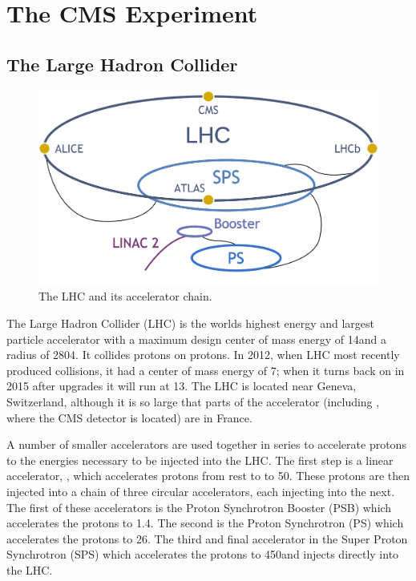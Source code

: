 
\chapter{The CMS Experiment}
\label{experiment_chapter}

\section{The Large Hadron Collider}
\label{lhc_section}

\begin{figure}[tb]
    \centering
    \includegraphics[width=\textwidth]{figures/alex_lhc_layout.pdf}
    \caption{The LHC and its accelerator chain.}
    \label{fig:lhc_layout}
\end{figure}

The Large Hadron Collider (LHC) is the worlds highest energy and largest
particle accelerator with a maximum design center of mass energy of 14\TeV and
a radius of 2804\meters \cite{bruning2004}. It collides protons on protons. In
2012, when LHC most recently produced collisions, it had a center of mass
energy of 7\TeV; when it turns back on in 2015 after upgrades it will run at
13\TeV. The LHC is located near Geneva, Switzerland, although it is so large
that parts of the accelerator (including \pointfive, where the CMS detector is
located) are in France.

A number of smaller accelerators are used together in series to accelerate
protons to the energies necessary to be injected into the LHC. The first step
is a linear accelerator, \linactwo, which accelerates protons from rest to to
50\MeV. These protons are then injected into a chain of three circular
accelerators, each injecting into the next. The first of these accelerators is
the Proton Synchrotron Booster (PSB) which accelerates the protons to 1.4\GeV.
The second is the Proton Synchrotron (PS) which accelerates the protons to
26\GeV. The third and final accelerator in the Super Proton Synchrotron (SPS)
which accelerates the protons to 450\GeV and injects directly into the LHC.

